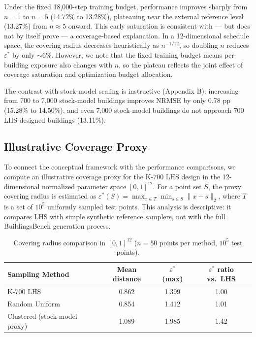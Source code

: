 \documentclass[preprint,12pt,authoryear]{elsarticle}
\begin{document}
Under the fixed 18,000-step training budget, performance improves sharply from $n = 1$ to $n = 5$ (14.72\% to 13.28\%), plateauing near the external reference level (13.27\%) from $n \approx 5$ onward. This early saturation is consistent with --- but does not by itself prove --- a coverage-based explanation. In a 12-dimensional schedule space, the covering radius decreases heuristically as $n^{-1/12}$, so doubling $n$ reduces $\varepsilon^*$ by only ${\sim}6\%$. However, we note that the fixed training budget means per-building exposure also changes with $n$, so the plateau reflects the joint effect of coverage saturation and optimization budget allocation.

The contrast with stock-model scaling is instructive (Appendix B): increasing from 700 to 7,000 stock-model buildings improves NRMSE by only 0.78 pp (15.28\% to 14.50\%), and even 7,000 stock-model buildings do not approach 700 LHS-designed buildings (13.11\%).

\subsection{Illustrative Coverage Proxy}
\label{sec:coverage_proxy}

To connect the conceptual framework with the performance comparisons, we compute an illustrative coverage proxy for the K-700 LHS design in the 12-dimensional normalized parameter space $[0,1]^{12}$. For a point set $S$, the proxy covering radius is estimated as $\varepsilon^*(S) = \max_{x \in T} \min_{s \in S} \|x - s\|_2$, where $T$ is a set of $10^5$ uniformly sampled test points. This analysis is descriptive: it compares LHS with simple synthetic reference samplers, not with the full BuildingsBench generation process.

\begin{table}[htbp]
\caption{Covering radius comparison in $[0,1]^{12}$ ($n = 50$ points per method, $10^5$ test points).}
\label{tab:coverage}
\centering
\begin{tabular}{lccc}
\toprule
Sampling Method & Mean distance & $\varepsilon^*$ (max) & $\varepsilon^*$ ratio vs.\ LHS \\
\midrule
K-700 LHS & 0.862 & 1.399 & 1.00 \\
Random Uniform & 0.854 & 1.412 & 1.01 \\
Clustered (stock-model proxy) & 1.089 & 1.985 & 1.42 \\
\bottomrule
\end{tabular}
\end{table}
\end{document}
